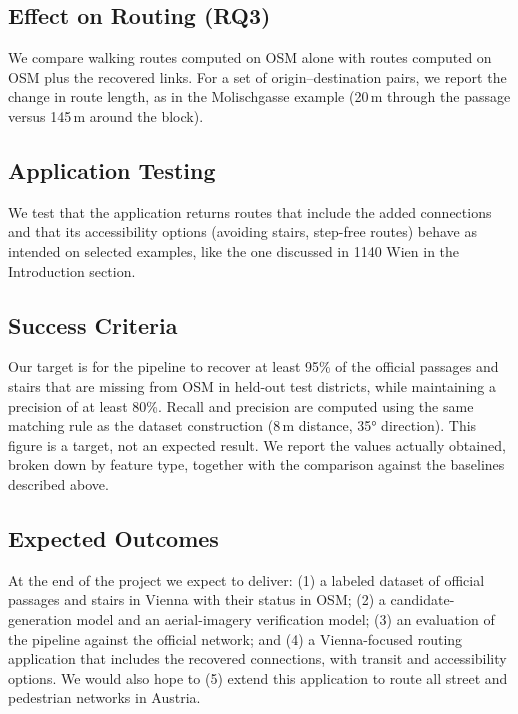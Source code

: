 \documentclass[conference]{IEEEtran}
\begin{document}
\subsection{Effect on Routing (RQ3)}
We compare walking routes computed on OSM alone with routes computed on OSM plus the recovered links. For a set of origin--destination pairs, we report the change in route length, as in the Molischgasse example (20\,m through the passage versus 145\,m around the block).

\subsection{Application Testing}

We test that the application returns routes that include the added connections and that its accessibility options (avoiding stairs, step-free routes) behave as intended on selected examples, like the one discussed in 1140 Wien in the Introduction section.

\subsection{Success Criteria}

Our target is for the pipeline to recover at least 95\% of the official passages and stairs that are missing from OSM in held-out test districts, while maintaining a precision of at least 80\%. Recall and precision are computed using the same matching rule as the dataset construction (8\,m distance, 35° direction). This figure is a target, not an expected result. We report the values actually obtained, broken down by feature type, together with the comparison against the baselines described above.

\subsection{Expected Outcomes}

At the end of the project we expect to deliver: (1) a labeled dataset of official passages and stairs in Vienna with their status in OSM; (2) a candidate-generation model and an aerial-imagery verification model; (3) an evaluation of the pipeline against the official network; and (4) a Vienna-focused routing application that includes the recovered connections, with transit and accessibility options. We would also hope to (5) extend this application to route all street and pedestrian networks in Austria.

\end{document}
